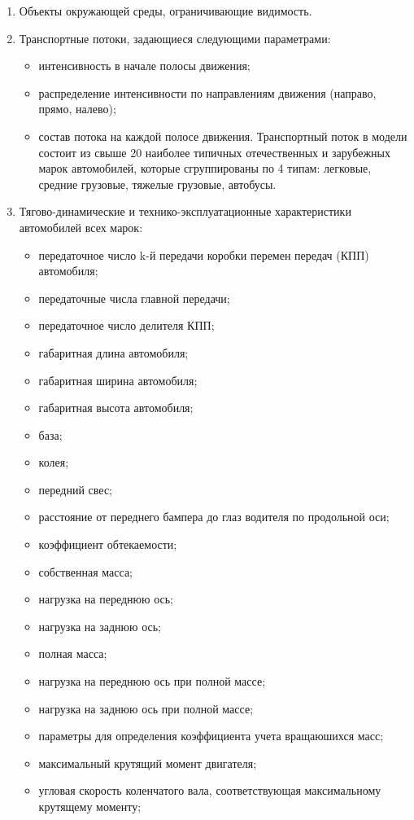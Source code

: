 \documentclass[a4paper,14pt]{article}
\begin{document}
\begin{enumerate}
\item Объекты окружающей среды, ограничивающие видимость.

\item Транспортные потоки, задающиеся следующими параметрами:
\begin{itemize}
\item интенсивность в начале полосы движения;
\item распределение интенсивности по направлениям движения (направо, прямо, налево);
\item состав потока на каждой полосе движения. Транспортный поток в модели состоит из свыше 20 наиболее типичных отечественных и зарубежных марок автомобилей, которые сгруппированы по 4 типам: легковые, средние грузовые, тяжелые грузовые, автобусы.
\end{itemize}
\item Тягово-динамические и технико-эксплуатационные характеристики автомобилей всех марок:
\begin{itemize}
\item передаточное число  k-й передачи коробки перемен передач (КПП) автомобиля;
\item передаточные числа главной передачи;
\item передаточное число делителя КПП;
\item габаритная длина автомобиля;
\item габаритная ширина автомобиля;
\item габаритная высота автомобиля;
\item база;
\item колея;
\item передний свес;
\item расстояние от переднего бампера до глаз водителя по продольной оси;
\item коэффициент обтекаемости;
\item собственная масса;
\item нагрузка на переднюю ось;
\item нагрузка на заднюю ось;
\item полная масса;
\item нагрузка на переднюю ось при полной массе;
\item нагрузка на заднюю ось при полной массе;
\item параметры для определения коэффициента учета вращаюшихся масс;
\item максимальный крутящий момент двигателя;
\item угловая скорость коленчатого вала, соответствующая максимальному крутящему моменту;

\end{itemize}
\end{enumerate}
\end{document}
